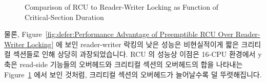 \begin{figure}[tb]
\begin{center}
\end{center}
\caption{Comparison of RCU to Reader-Writer Locking as Function of Critical-Section Duration}
\label{fig:defer:Comparison of RCU to Reader-Writer Locking as Function of Critical-Section Duration}
\end{figure}

물론,
Figure~\ref{fig:defer:Performance Advantage of Preemptible RCU Over Reader-Writer Locking}
에 보인 reader-writer 락킹의 낮은 성능은 비현실적이게 짧은 크리티컬 섹션들로
인해 상당히 과장되었습니다.
RCU 의 성능상 이점은 16-CPU 환경에서 y 축은 read-side 기능들의 오버헤드와
크리티컬 섹션의 오버헤드의 합을 나타내는
Figure~\ref{fig:defer:Comparison of RCU to Reader-Writer Locking as Function of Critical-Section Duration}
에서 보인 것처럼, 크리티컬 섹션의 오버헤드가 늘어날수록 덜 뚜렷해집니다.

